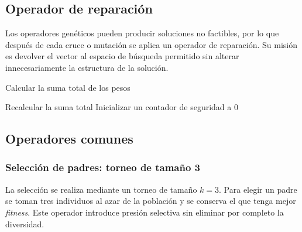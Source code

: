\subsection{Operador de reparación}
Los operadores genéticos pueden producir soluciones no factibles, por lo que después de cada cruce o mutación se aplica un operador de reparación. Su misión es devolver el vector al espacio de búsqueda permitido sin alterar innecesariamente la estructura de la solución.

\begin{algorithm}[H]
\SetAlgoLined
{}

Calcular la suma total de los pesos\;


Recalcular la suma total\;
Inicializar un contador de seguridad a 0\;

\caption{Reparación de una solución}
\end{algorithm}

\subsection{Operadores comunes}
\subsubsection{Selección de padres: torneo de tamaño 3}
La selección se realiza mediante un torneo de tamaño $k=3$. Para elegir un padre se toman tres individuos al azar de la población y se conserva el que tenga mejor \textit{fitness}. Este operador introduce presión selectiva sin eliminar por completo la diversidad.

